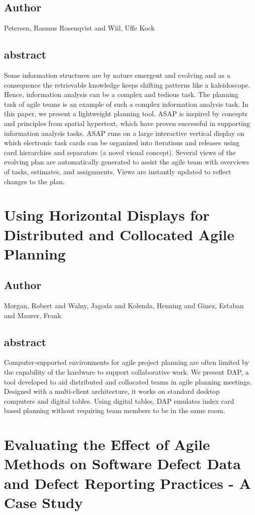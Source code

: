 \documentclass[lnbip,sechang,a4paper]{svmultln}
\begin{document}
\subsection{Author}
Petersen, Rasmus Rosenqvist and Wiil, Uffe Kock
\subsection{abstract}
Some information structures are by nature emergent and evolving and as a
consequence the retrievable knowledge keeps shifting patterns like a
kaleidoscope. Hence, information analysis can be a complex and tedious task. The planning task of agile teams is an example of such a complex information analysis task. In this paper, we present a lightweight planning tool. ASAP is inspired by concepts and principles from spatial hypertext, which have proven successful in supporting information analysis tasks. ASAP runs on a large interactive vertical display on which electronic task cards can be organized into iterations and releases using card hierarchies and separators (a novel visual concept). Several views of the evolving plan are automatically generated to assist the agile team with overviews of tasks, estimates, and assignments. Views are instantly updated to reflect changes to the plan.
\cite{springerlink:10.1007/978-3-642-20116-5_20}
\section{Using Horizontal Displays for Distributed and Collocated Agile Planning}
\subsection{Author}
Morgan, Robert and Walny, Jagoda and Kolenda, Henning and Ginez, Estaban and
Maurer, Frank
\subsection{abstract}
Computer-supported environments for agile project planning are often limited by
the capability of the hardware to support collaborative work. We present DAP, a
tool developed to aid distributed and collocated teams in agile planning meetings. Designed with a multi-client architecture, it works on standard desktop computers and digital tables. Using digital tables, DAP emulates index card based planning without requiring team members to be in the same room.
\cite{springerlink:10.1007/978-3-540-73101-6_6}
\section{Evaluating the Effect of Agile Methods on Software Defect Data and
Defect Reporting Practices - A Case Study}
\end{document}
